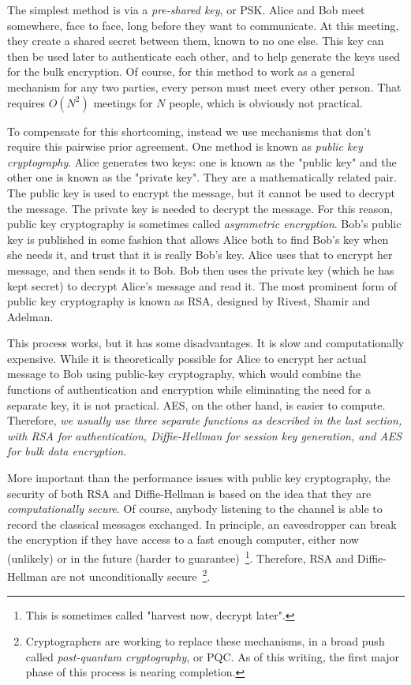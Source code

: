 The simplest method is via a \emph{pre-shared key}, or PSK. Alice and Bob meet somewhere, face to face, long before they want to communicate.  At this meeting, they create a shared secret between them, known to no one else.  This key can then be used later to authenticate each other, and to help generate the keys used for the bulk encryption.  Of course, for this method to work as a general mechanism for any two parties, every person must meet every other person.  That requires $O(N^2)$ meetings for $N$ people, which is obviously not practical.

To compensate for this shortcoming, instead we use mechanisms that don't require this pairwise prior agreement. One method is known as \emph{public key cryptography}. Alice generates two keys: one is known as the "public key" and the other one is known as the "private key".  They are a mathematically related pair.  The public key is used to encrypt the message, but it cannot be used to decrypt the message. 
The private key is needed to decrypt the message.  For this reason, public key cryptography is sometimes called \emph{asymmetric encryption}.  Bob's public key is published in some fashion that allows Alice both to find Bob's key when she needs it, and trust that it is really Bob's key.  Alice uses that to encrypt her message, and then sends it to Bob. Bob then uses the private key (which he has kept secret) to decrypt Alice's message and read it.  The most prominent form of public key cryptography is known as RSA, designed by Rivest, Shamir and Adelman.

This process works, but it has some disadvantages. It is slow and computationally expensive. While it is theoretically possible for Alice to encrypt her actual message to Bob using public-key cryptography, which would combine the functions of authentication and encryption while eliminating the need for a separate key, it is not practical.  AES, on the other hand, is easier to compute.  Therefore, \emph{we usually use three separate functions as described in the last section, with RSA for authentication, Diffie-Hellman for session key generation, and AES for bulk data encryption.}

More important than the performance issues with public key cryptography, the security of both RSA and Diffie-Hellman is based on the idea that they are \emph{computationally secure}.  Of course, anybody listening to the channel is able to record the classical messages exchanged. In principle, an eavesdropper can break the encryption if they have access to a fast enough computer, either now (unlikely) or in the future (harder to guarantee)~\footnote{This is sometimes called "harvest now, decrypt later".}.  Therefore, RSA and Diffie-Hellman are not unconditionally secure~\footnote{Cryptographers are working to replace these mechanisms, in a broad push called \emph{post-quantum cryptography}, or PQC.  As of this writing, the first major phase of this process is nearing completion.}.

